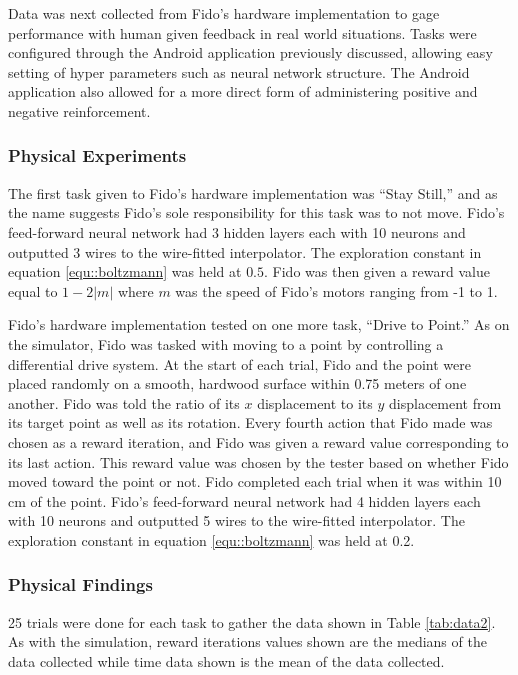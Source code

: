 Data was next collected from Fido's hardware implementation to gage performance with human given feedback in real world situations.
Tasks were configured through the Android application previously discussed, allowing easy setting of hyper parameters such as neural network structure.
The Android application also allowed for a more direct form of administering positive and negative reinforcement.


\subsubsection{Physical Experiments}

The first task given to Fido's hardware implementation was ``Stay Still,'' and as the name suggests Fido's sole responsibility for this task was to not move.
Fido's feed-forward neural network had 3 hidden layers each with 10 neurons and outputted 3 wires to the wire-fitted interpolator.
The exploration constant in equation \ref{equ::boltzmann} was held at $0.5$.
Fido was then given a reward value equal to $1 - 2|m|$ where $m$ was the speed of Fido's motors ranging from -1 to 1.

Fido's hardware implementation tested on one more task, ``Drive to Point.'' As on the simulator, Fido was tasked with moving to a point by controlling a differential drive system.
 At the start of each trial, Fido and the point were placed randomly on a smooth, hardwood surface within 0.75 meters of one another.
Fido was told the ratio of its $x$ displacement to its $y$ displacement from its target point as well as its rotation.
Every fourth action that Fido made was chosen as a reward iteration, and Fido was given a reward value corresponding to its last action.
This reward value was chosen by the tester based on whether Fido moved toward the point or not.
Fido completed each trial when it was within 10 cm of the point.
Fido's feed-forward neural network had 4 hidden layers each with 10 neurons and outputted 5 wires to the wire-fitted interpolator.
The exploration constant in equation \ref{equ::boltzmann} was held at 0.2.

\subsubsection{Physical Findings}

25 trials were done for each task to gather the data shown in Table \ref{tab:data2}.
As with the simulation, reward iterations values shown are the medians of the data collected while time data shown is the mean of the data collected.


